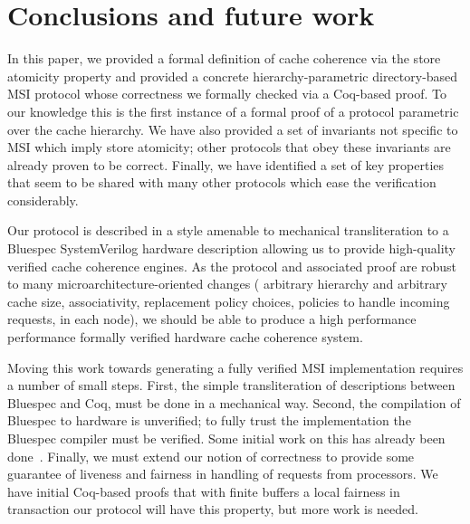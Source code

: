 \section{Conclusions and future work}

In this paper, we provided a formal definition of cache coherence via the store
atomicity property and provided a concrete hierarchy-parametric directory-based
MSI protocol whose correctness we formally checked via a Coq-based proof. To our
knowledge this is the first instance of a formal proof of a protocol parametric
over the cache hierarchy. We have also provided a set of invariants not
specific to MSI which imply store atomicity; other protocols that obey these
invariants are already proven to be correct. Finally, we have identified a set
of key properties that seem to be shared with many other protocols which ease
the verification considerably.

Our protocol is described in a style amenable to mechanical transliteration to a
Bluespec SystemVerilog hardware description allowing us to provide high-quality
verified cache coherence engines. As the protocol and associated proof are robust
to many microarchitecture-oriented changes (\eg{} arbitrary hierarchy and
arbitrary cache size, associativity, replacement policy choices, policies to
handle incoming requests, \etc{} in each node), we should be able to produce a
high performance performance formally verified hardware cache coherence system.

Moving this work towards generating a fully verified MSI implementation
requires a number of small steps. First, the simple transliteration of
descriptions between Bluespec and Coq, must be done in a mechanical way.
Second, the compilation of Bluespec to hardware is unverified; to fully trust
the implementation the Bluespec compiler must be verified. Some initial work on
this has already been done~\cite{TDBLP:conf/cav/BraibantC13}. Finally, we must
extend our notion of correctness to provide some guarantee of
liveness and fairness in handling of requests from processors. We have
initial Coq-based proofs that with finite buffers a local fairness in
transaction our protocol will have this property, but more work is needed. 


